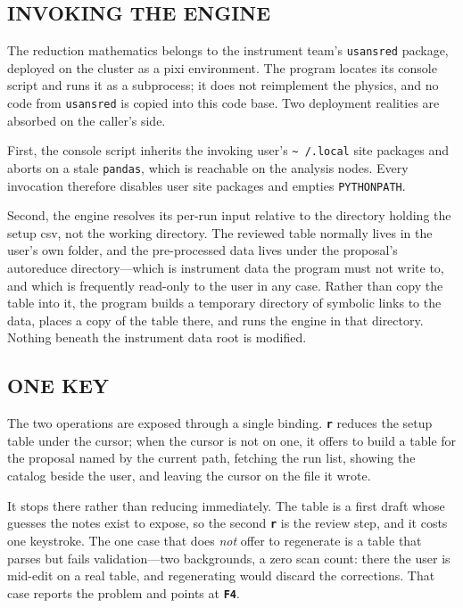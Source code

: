 \documentclass[tm]{ornltm}
\newcommand{\key}[1]{\textbf{\texttt{#1}}}
\begin{document}
\subsection{INVOKING THE ENGINE}

The reduction mathematics belongs to the instrument team's \texttt{usansred}
package, deployed on the cluster as a pixi environment. The program locates its
console script and runs it as a subprocess; it does not reimplement the
physics, and no code from \texttt{usansred} is copied into this code base.
Two deployment realities are absorbed on the caller's side.

First, the console script inherits the invoking user's \texttt{\textasciitilde
/.local} site packages and aborts on a stale \texttt{pandas}, which is reachable
on the analysis nodes. Every invocation therefore disables user site packages and
empties \texttt{PYTHONPATH}.

Second, the engine resolves its per-run input relative to the directory holding
the setup \ac{csv}, not the working directory. The reviewed table normally lives
in the user's own folder, and the pre-processed data lives under the proposal's
autoreduce directory---which is instrument data the program must not write to,
and which is frequently read-only to the user in any case. Rather than copy the
table into it, the program builds a temporary directory of symbolic links to the
data, places a copy of the table there, and runs the engine in that directory.
Nothing beneath the instrument data root is modified.

\subsection{ONE KEY}

The two operations are exposed through a single binding. \key{r} reduces the
setup table under the cursor; when the cursor is not on one, it offers to build
a table for the proposal named by the current path, fetching the run list,
showing the catalog beside the user, and leaving the cursor on the file it wrote.

It stops there rather than reducing immediately. The table is a first draft whose
guesses the notes exist to expose, so the second \key{r} is the review step, and
it costs one keystroke. The one case that does \emph{not} offer to regenerate is
a table that parses but fails validation---two backgrounds, a zero scan count:
there the user is mid-edit on a real table, and regenerating would discard the
corrections. That case reports the problem and points at \key{F4}.
\end{document}
